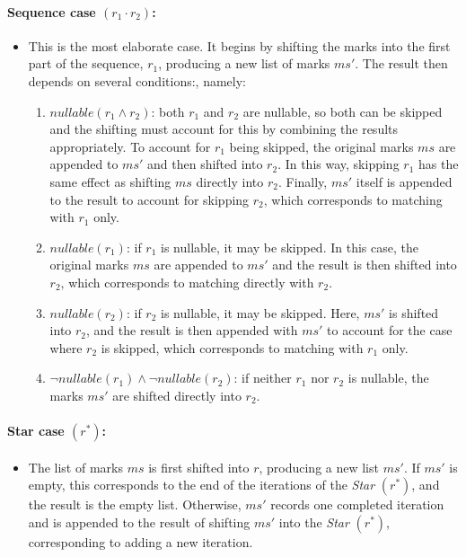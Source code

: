 \documentclass[12pt]{article}
\newcommand{\nullable}{\textit{nullable}}
\newcommand{\STARText}{\textit{Star} $(r^*)$}
\begin{document}
\paragraph*{\textbf{Sequence case} $(r_1 \cdot r_2)$:}
\begin{itemize}
\item This is the most elaborate case. It begins by shifting the marks into the first part of the sequence, $r_1$, 
producing a new list of marks $ms'$. The result then depends on several conditions:, namely:
    \begin{enumerate}
      \item $\nullable(r_1 \land r_2)$: both $r_1$ and $r_2$ are nullable, 
            so both can be skipped and the shifting must account for this by combining the results appropriately. 
            To account for $r_1$ being skipped, the original marks $ms$ are appended to $ms'$ and then shifted into $r_2$.  
            In this way, skipping $r_1$ has the same effect as shifting $ms$ directly into $r_2$. 
            Finally, $ms'$ itself is appended to the result to account for skipping $r_2$, 
            which corresponds to matching with $r_1$ only.

      \item $\nullable(r_1)$: if $r_1$ is nullable, it may be skipped. 
            In this case, the original marks $ms$ are appended to $ms'$ 
            and the result is then shifted into $r_2$, 
            which corresponds to matching directly with $r_2$.

      \item $\nullable(r_2)$: if $r_2$ is nullable, it may be skipped. 
            Here, $ms'$ is shifted into $r_2$, and the result is then appended with $ms'$ 
            to account for the case where $r_2$ is skipped, 
            which corresponds to matching with $r_1$ only.

      \item $\neg\nullable(r_1) \land \neg\nullable(r_2)$: 
            if neither $r_1$ nor $r_2$ is nullable, 
            the marks $ms'$ are shifted directly into $r_2$.
    \end{enumerate}
\end{itemize}

\paragraph*{\textbf{Star case} $(r^*)$:}
\begin{itemize}
  \item The list of marks $ms$ is first shifted into $r$, producing a new list $ms'$.  
        If $ms'$ is empty, this corresponds to the end of the iterations of the \STARText, 
        and the result is the empty list.  
        Otherwise, $ms'$ records one completed iteration and is appended to the result of shifting $ms'$ into the \STARText, 
        corresponding to adding a new iteration.
\end{itemize}
\end{document}
